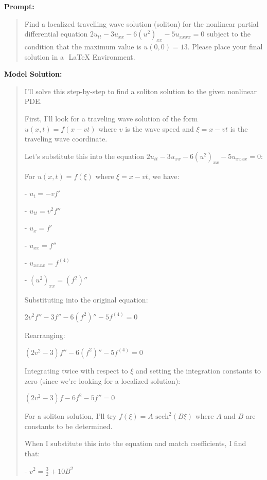 \documentclass{article}
\begin{document}
\textbf{Prompt:}
\begin{quote}
Find a localized travelling wave solution (soliton) for the nonlinear partial differential equation $2u_{tt} - 3u_{xx} - 6(u^2)_{xx} - 5u_{xxxx}=0$ subject to the condition that the maximum value is $u(0,0) = 13$. Please place your final solution in a $\boxed{}$ LaTeX Environment.
\end{quote}
\textbf{Model Solution:}
\begin{quote}
I'll solve this step-by-step to find a soliton solution to the given nonlinear PDE.



First, I'll look for a traveling wave solution of the form $u(x,t) = f(x-vt)$ where $v$ is the wave speed and $\xi = x-vt$ is the traveling wave coordinate.



Let's substitute this into the equation $2u_{tt} - 3u_{xx} - 6(u^2)_{xx} - 5u_{xxxx}=0$:



For $u(x,t) = f(\xi)$ where $\xi = x-vt$, we have:

- $u_t = -v f'$

- $u_{tt} = v^2 f''$

- $u_x = f'$

- $u_{xx} = f''$

- $u_{xxxx} = f^{(4)}$

- $(u^2)_{xx} = (f^2)''$



Substituting into the original equation:

$2v^2 f'' - 3f'' - 6(f^2)'' - 5f^{(4)} = 0$



Rearranging:

$(2v^2 - 3)f'' - 6(f^2)'' - 5f^{(4)} = 0$



Integrating twice with respect to $\xi$ and setting the integration constants to zero (since we're looking for a localized solution):

$(2v^2 - 3)f - 6f^2 - 5f'' = 0$



For a soliton solution, I'll try $f(\xi) = A \text{ sech}^2(B\xi)$ where $A$ and $B$ are constants to be determined.



When I substitute this into the equation and match coefficients, I find that:

- $v^2 = \frac{3}{2} + 10B^2$


\end{quote}
\end{document}
